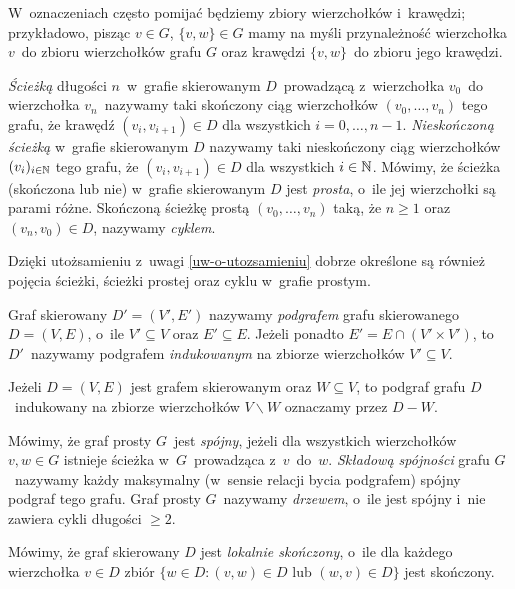 W~oznaczeniach często pomijać będziemy zbiory wierzchołków i~krawędzi; przykładowo, pisząc $v\in G$, $\{v,w\}\in G$ mamy na myśli przynależność wierzchołka $v$~do zbioru wierzchołków grafu $G$ oraz krawędzi $\{v,w\}$~do zbioru jego krawędzi.

\textit{Ścieżką} długości $n$~w~grafie skierowanym $D$~prowadzącą z~wierzchołka $v_0$~do wierzchołka $v_n$~nazywamy taki skończony ciąg wierzchołków $(v_0,\ldots,v_n)$ tego grafu, że krawędź $(v_i,v_{i+1})\in D$ dla wszystkich $i=0,\ldots,n-1$. \textit{Nieskończoną ścieżką} w~grafie skierowanym $D$ nazywamy taki nieskończony ciąg wierzchołków $(v_i)_{i\in\mathbb{N}}$ tego grafu, że $(v_i,v_{i+1})\in D$ dla wszystkich $i\in\mathbb{N}$. Mówimy, że ścieżka (skończona lub nie) w~grafie skierowanym $D$ jest \textit{prosta}, o~ile jej wierzchołki są parami różne. Skończoną ścieżkę prostą $(v_0,\ldots,v_n)$ taką, że $n\geq 1$ oraz $(v_n,v_0)\in D$, nazywamy \textit{cyklem}.

Dzięki utożsamieniu z~uwagi \ref{uw-o-utozsamieniu} dobrze określone są również pojęcia ścieżki, ścieżki prostej oraz cyklu w~grafie prostym.

Graf skierowany $D'=(V',E')$ nazywamy \textit{podgrafem} grafu skierowanego $D=(V,E)$, o~ile $V'\subseteq V$ oraz $E'\subseteq E$. Jeżeli ponadto $E'=E\cap \left(V'\times V'\right)$, to $D'$~nazywamy podgrafem \textit{indukowanym} na zbiorze wierzchołków $V'\subseteq V$. 

Jeżeli $D=(V,E)$ jest grafem skierowanym oraz $W\subseteq V$, to podgraf grafu $D$~indukowany na zbiorze wierzchołków $V\smallsetminus W$ oznaczamy przez $D-W$.


Mówimy, że graf prosty $G$~jest \textit{spójny}, jeżeli dla wszystkich wierzchołków $v,w\in G$ istnieje ścieżka w~$G$~prowadząca z~$v$~do~$w$. \textit{Składową spójności} grafu $G$~nazywamy każdy maksymalny (w~sensie relacji bycia podgrafem) spójny podgraf tego grafu. Graf prosty $G$~nazywamy \textit{drzewem}, o~ile jest spójny i~nie zawiera cykli długości $\geq 2$.

Mówimy, że graf skierowany $D$ jest \textit{lokalnie skończony}, o~ile dla każdego wierzchołka $v\in D$ zbiór $\{w\in D:(v,w)\in D\text{ lub } (w,v)\in D\}$ jest skończony. 

